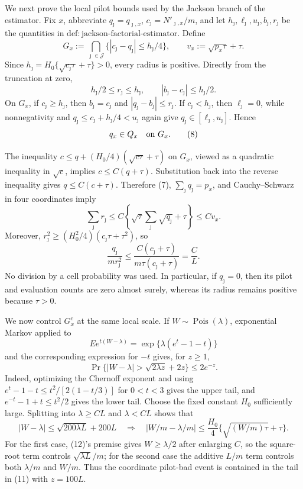 We next prove the local pilot bounds used by the Jackson branch of the estimator.  Fix \(x\), abbreviate \(q_\jmath=q_{\jmath,x}\), \(c_\jmath=N'_{\jmath,x}/m\), and let \(h_\jmath,\ell_\jmath,u_\jmath,b_\jmath,r_\jmath\) be the quantities in \(\mathrm{def:jackson\mbox{-}factorial\mbox{-}estimator}\).  Define
\[
 G_x:=\bigcap_{\jmath\in\mathcal J}
 \{|c_\jmath-q_\jmath|\leq h_\jmath/4\},
 \qquad
 v_x:=\sqrt{p_x\tau}+\tau.                                       \tag{6}
\]
Since \(h_\jmath=H_0\{\sqrt{c_\jmath\tau}+\tau\}>0\), every radius is positive.  Directly from the truncation at zero,
\[
 h_\jmath/2\leq r_\jmath\leq h_\jmath,
 \qquad |b_\jmath-c_\jmath|\leq h_\jmath/2.                     \tag{7}
\]
On \(G_x\), if \(c_\jmath\geq h_\jmath\), then \(b_\jmath=c_\jmath\) and \(|q_\jmath-b_\jmath|\leq r_\jmath\).  If \(c_\jmath<h_\jmath\), then \(\ell_\jmath=0\), while nonnegativity and \(q_\jmath\leq c_\jmath+h_\jmath/4<u_\jmath\) again give \(q_\jmath\in[\ell_\jmath,u_\jmath]\).  Hence
\[
 q_x\in Q_x\quad\hbox{on }G_x.                                  \tag{8}
\]

The inequality \(c\leq q+(H_0/4)(\sqrt{c\tau}+\tau)\) on \(G_x\), viewed as a quadratic inequality in \(\sqrt c\), implies \(c\leq C(q+\tau)\).  Substitution back into the reverse inequality gives \(q\leq C(c+\tau)\).  Therefore (7), \(\sum_\jmath q_\jmath=p_x\), and Cauchy--Schwarz in four coordinates imply
\[
 \sum_\jmath r_\jmath
 \leq C\left\{\sqrt{\tau}\sum_\jmath\sqrt{q_\jmath}+\tau\right\}
 \leq C v_x.                                                       \tag{9}
\]
Moreover, \(r_\jmath^2\geq(H_0^2/4)(c_\jmath\tau+\tau^2)\), so
\[
 \frac{q_\jmath}{m r_\jmath^2}
 \leq \frac{C(c_\jmath+\tau)}{m\tau(c_\jmath+\tau)}
 =\frac C L.                                                       \tag{10}
\]
No division by a cell probability was used.  In particular, if \(q_\jmath=0\), then its pilot and evaluation counts are zero almost surely, whereas its radius remains positive because \(\tau>0\).

We now control \(G_x^c\) at the same local scale.  If \(W\sim\operatorname{Pois}(\lambda)\), exponential Markov applied to
\[
 E e^{t(W-\lambda)}=\exp\{\lambda(e^t-1-t)\}
\]
and the corresponding expression for \(-t\) gives, for \(z\geq1\),
\[
 \Pr\{|W-\lambda|>\sqrt{2\lambda z}+2z\}\leq2e^{-z}.             \tag{11}
\]
Indeed, optimizing the Chernoff exponent and using \(e^t-1-t\leq t^2/[2(1-t/3)]\) for \(0<t<3\) gives the upper tail, and \(e^{-t}-1+t\leq t^2/2\) gives the lower tail.  Choose the fixed constant \(H_0\) sufficiently large.  Splitting into \(\lambda\geq C L\) and \(\lambda<C L\) shows that
\[
 |W-\lambda|\leq\sqrt{200\lambda L}+200L
 \quad\Longrightarrow\quad
 |W/m-\lambda/m|\leq\frac{H_0}{4}
 \{\sqrt{(W/m)\tau}+\tau\}.                                    \tag{12}
\]
For the first case, (12)'s premise gives \(W\geq\lambda/2\) after enlarging \(C\), so the square-root term controls \(\sqrt{\lambda L}/m\); for the second case the additive \(L/m\) term controls both \(\lambda/m\) and \(W/m\).  Thus the coordinate pilot-bad event is contained in the tail in (11) with \(z=100L\).


